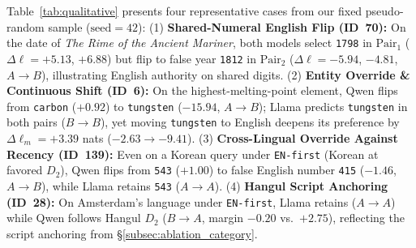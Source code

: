 Table~\ref{tab:qualitative} presents four representative cases from our fixed pseudo-random sample ($\text{seed}{=}42$): (1) \textbf{Shared-Numeral English Flip (ID~70):} On the date of \emph{The Rime of the Ancient Mariner}, both models select \texttt{1798} in $\text{Pair}_1$ ($\Delta\ell{=}{+}5.13$, $+6.88$) but flip to false year \texttt{1812} in $\text{Pair}_2$ ($\Delta\ell{=}{-}5.94$, $-4.81$, $A \to B$), illustrating English authority on shared digits. (2) \textbf{Entity Override \& Continuous Shift (ID~6):} On the highest-melting-point element, Qwen flips from \texttt{carbon} ($+0.92$) to \texttt{tungsten} ($-15.94$, $A \to B$); Llama predicts \texttt{tungsten} in both pairs ($B \to B$), yet moving \texttt{tungsten} to English deepens its preference by $\Delta\ell_m{=}{+}3.39$ nats ($-2.63 \to -9.41$). (3) \textbf{Cross-Lingual Override Against Recency (ID~139):} Even on a Korean query under \texttt{EN-first} (Korean at favored $D_2$), Qwen flips from \texttt{543} ($+1.00$) to false English number \texttt{415} ($-1.46$, $A \to B$), while Llama retains \texttt{543} ($A \to A$). (4) \textbf{Hangul Script Anchoring (ID~28):} On Amsterdam's language under \texttt{EN-first}, Llama retains  ($A \to A$) while Qwen follows Hangul $D_2$ ($B \to A$, margin $-0.20$ vs.\ $+2.75$), reflecting the script anchoring from \S\ref{subsec:ablation_category}.
